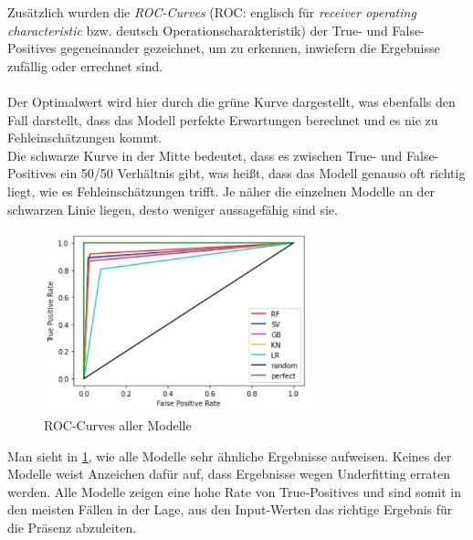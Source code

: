 \newpage
Zusätzlich wurden die \textit{ROC-Curves} (ROC: englisch für \textit{receiver operating characteristic} bzw. 
deutsch Operationscharakteristik)
der True- und False-Positives gegeneinander gezeichnet, um zu erkennen, 
inwiefern die Ergebnisse zufällig oder errechnet sind.\\\\
Der Optimalwert wird hier durch die grüne Kurve dargestellt, was ebenfalls den Fall darstellt, 
dass das Modell perfekte Erwartungen berechnet und es nie zu Fehleinschätzungen kommt.\\
Die schwarze Kurve in der Mitte bedeutet, dass es zwischen True- und False-Positives ein 50/50 Verhältnis gibt, 
was heißt, dass das Modell genauso oft richtig liegt, wie es Fehleinschätzungen trifft. Je näher die einzelnen
Modelle an der schwarzen Linie liegen, desto weniger aussagefähig sind sie. 

\begin{figure}[h]
    \centering
    \includegraphics[width=0.7\textwidth]{pic/roc_curves.png}
    \caption{ROC-Curves aller Modelle}
    \label{fig:Roc_curves}
\end{figure}

Man sieht in \ref{fig:Roc_curves}, wie alle Modelle sehr ähnliche Ergebnisse aufweisen. Keines der Modelle weist Anzeichen 
dafür auf, dass Ergebnisse wegen Underfitting erraten werden. Alle Modelle zeigen eine hohe Rate von True-Positives und
sind somit in den meisten Fällen in der Lage, aus den Input-Werten das richtige Ergebnis für die Präsenz abzuleiten.  


